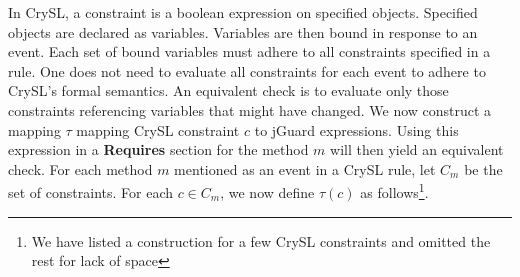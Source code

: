 \documentclass{article}
\begin{document}
In CrySL, a constraint is a boolean expression on specified objects.
Specified objects are declared as variables. Variables are then bound in response to an event.
Each set of bound variables must adhere to all constraints specified in a rule. One does not need to evaluate all constraints for each event to adhere to CrySL's formal semantics. An equivalent check is to evaluate only those constraints referencing variables that might have changed. We now construct a mapping $\tau$ mapping CrySL constraint $c$ to jGuard expressions. Using this expression in a \textbf{Requires} section for the method $m$ will then yield an equivalent check. For each method $m$ mentioned as an event in a CrySL rule, let $C_m$ be the set of constraints.  For each $c \in C_m$, we now define $\tau(c)$ as follows\footnote{We have listed a construction for a few CrySL constraints and omitted the rest for lack of space}.
\end{document}
